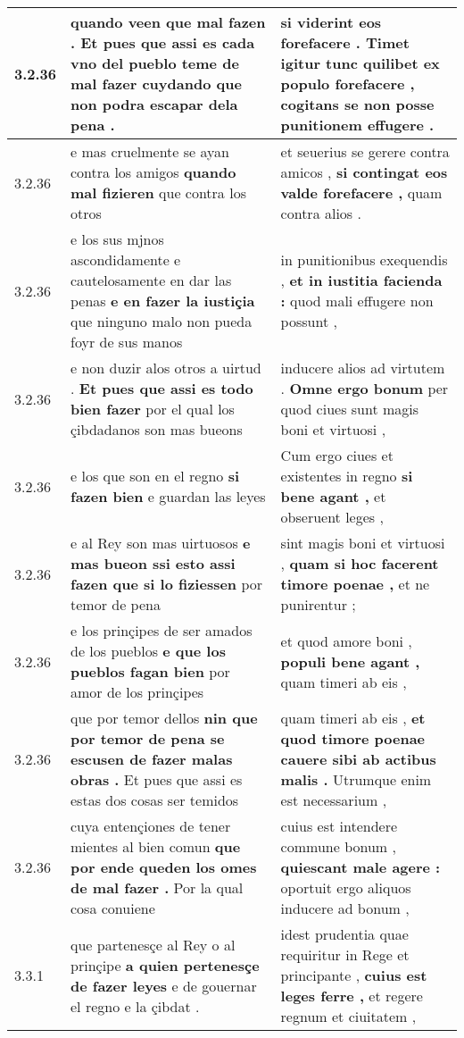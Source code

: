 \begin{tabular}{|p{1cm}|p{6.5cm}|p{6.5cm}|}
3.2.36 & quando veen que mal fazen . \textbf{ Et pues que assi es cada vno del pueblo teme de mal fazer cuydando } que non podra escapar dela pena . & si viderint eos forefacere . \textbf{ Timet igitur tunc quilibet ex populo forefacere , } cogitans se non posse punitionem effugere . \\\hline
3.2.36 & e mas cruelmente se ayan contra los amigos \textbf{ quando mal fizieren } que contra los otros & et seuerius se gerere contra amicos , \textbf{ si contingat eos valde forefacere , } quam contra alios . \\\hline
3.2.36 & e los sus mjnos ascondidamente e cautelosamente en dar las penas \textbf{ e en fazer la iustiçia } que ninguno malo non pueda foyr de sus manos & in punitionibus exequendis , \textbf{ et in iustitia facienda : } quod mali effugere non possunt , \\\hline
3.2.36 & e non duzir alos otros a uirtud . \textbf{ Et pues que assi es todo bien fazer } por el qual los çibdadanos son mas bueons & inducere alios ad virtutem . \textbf{ Omne ergo bonum } per quod ciues sunt magis boni et virtuosi , \\\hline
3.2.36 & e los que son en el regno \textbf{ si fazen bien } e guardan las leyes & Cum ergo ciues et existentes in regno \textbf{ si bene agant , } et obseruent leges , \\\hline
3.2.36 & e al Rey son mas uirtuosos \textbf{ e mas bueon ssi esto assi fazen que si lo fiziessen } por temor de pena & sint magis boni et virtuosi , \textbf{ quam si hoc facerent timore poenae , } et ne punirentur ; \\\hline
3.2.36 & e los prinçipes de ser amados de los pueblos \textbf{ e que los pueblos fagan bien } por amor de los prinçipes & et quod amore boni , \textbf{ populi bene agant , } quam timeri ab eis , \\\hline
3.2.36 & que por temor dellos \textbf{ nin que por temor de pena se escusen de fazer malas obras . } Et pues que assi es estas dos cosas ser temidos & quam timeri ab eis , \textbf{ et quod timore poenae cauere sibi ab actibus malis . } Utrumque enim est necessarium , \\\hline
3.2.36 & cuya entençiones de tener mientes al bien comun \textbf{ que por ende queden los omes de mal fazer . } Por la qual cosa conuiene & cuius est intendere commune bonum , \textbf{ quiescant male agere : } oportuit ergo aliquos inducere ad bonum , \\\hline
3.3.1 & que partenesçe al Rey o al prinçipe \textbf{ a quien pertenesçe de fazer leyes } e de gouernar el regno e la çibdat . & idest prudentia quae requiritur in Rege et principante , \textbf{ cuius est leges ferre , } et regere regnum et ciuitatem , \\\hline

\end{tabular}
